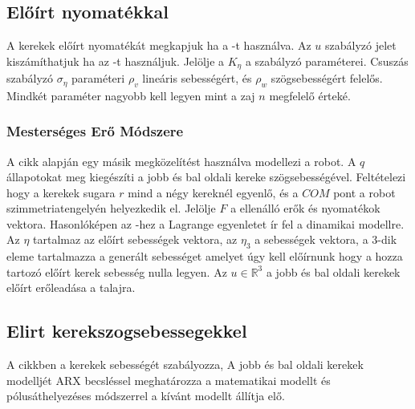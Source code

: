 \subsection{Előírt nyomatékkal}

A kerekek előírt nyomatékát megkapjuk ha a   -t használva. Az $u$ szabályzó jelet kiszámíthatjuk ha az -t használjuk. Jelölje a $K_\eta$ a szabályzó paraméterei. Csuszás szabályzó  $\sigma_\eta$ paraméteri $\rho_v$ lineáris sebességért, és $\rho_w$ szögsebességért felelős. Mindkét paraméter nagyobb kell legyen mint a zaj $n$ megfelelő érteké.

\renewcommand{\img}{SajatRobot/SzerkAbrak/SebContRefNyom.tex}
\renewcommand{\sources}{*}
\renewcommand{\captionn}{Kinematikai modell az $SSMR$ típusú $MR$ robotnak.}
\renewcommand{\figlabel}{DinamicSpeedController}








\subsubsection{Mesterséges Erő Módszere}
A \cite{SSMRartificialForceMethod} cikk alapján egy másik megközelítést használva modellezi a robot. A $q$ állapotokat meg kiegészíti a jobb és bal oldali kereke szögsebességével. Feltételezi hogy a kerekek sugara $r$ mind a négy kereknél egyenlő, és a $COM$ pont a robot szimmetriatengelyén helyezkedik el. Jelölje $F$ a ellenálló erők és nyomatékok vektora. Hasonlóképen az   -hez a Lagrange egyenletet ír fel a dinamikai modellre. Az $\eta$ tartalmaz az előírt sebességek vektora, az $\eta_{3}$ a sebességek vektora, a 3-dik eleme tartalmazza a generált sebességet amelyet úgy kell előírnunk hogy a hozza tartozó előírt kerek sebesség nulla legyen.
Az $u \in \mathbb{R}^3$ a jobb és bal oldali kerekek előírt erőleadása a talajra.







\subsection{Elirt kerekszogsebessegekkel}
A \cite{Campa2014} cikkben a kerekek sebességét szabályozza, A jobb és bal oldali kerekek modelljét ARX becsléssel meghatározza a matematikai modellt és pólusáthelyezéses  módszerrel a kívánt modellt állítja elő. 

\renewcommand{\img}{SajatRobot/SzerkAbrak/SebContRefOmega.tex}
\renewcommand{\sources}{*}
\renewcommand{\captionn}{Kinematikai modell az $SSMR$ típusú $MR$ robotnak.}
\renewcommand{\figlabel}{DinamicSpeedController}




